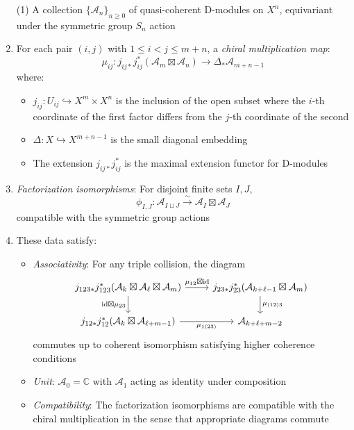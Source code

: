 \begin{enumerate}
\item[(1)] A collection $\{\mathcal{A}_n\}_{n \geq 0}$ of quasi-coherent D-modules on $X^n$, equivariant under 
the symmetric group $S_n$ action

\item For each pair $(i,j)$ with $1 \leq i < j \leq m+n$, a \emph{chiral multiplication map}:
\[
\mu_{ij}: j_{ij*}j_{ij}^* \left(\mathcal{A}_m \boxtimes \mathcal{A}_n\right) \to \Delta_{*}\mathcal{A}_{m+n-1}
\]
where:
\begin{itemize}
\item $j_{ij}: U_{ij} \hookrightarrow X^m \times X^n$ is the inclusion of the open subset where the 
$i$-th coordinate of the first factor differs from the $j$-th coordinate of the second
\item $\Delta: X \hookrightarrow X^{m+n-1}$ is the small diagonal embedding
\item The extension $j_{ij*}j_{ij}^*$ is the maximal extension functor for D-modules
\end{itemize}
 
\item \emph{Factorization isomorphisms}: For disjoint finite sets $I, J$,
\[
\phi_{I,J}: \mathcal{A}_{I \sqcup J} \xrightarrow{\sim} \mathcal{A}_I \boxtimes \mathcal{A}_J
\]
compatible with the symmetric group actions
 
\item These data satisfy:
\begin{itemize}
\item \emph{Associativity}: For any triple collision, the diagram
\[
\begin{tikzcd}
j_{123*}j_{123}^*(\mathcal{A}_k \boxtimes \mathcal{A}_\ell \boxtimes \mathcal{A}_m) 
\arrow[r, "\mu_{12} \boxtimes \text{id}"] \arrow[d, "\text{id} \boxtimes \mu_{23}"'] &
j_{23*}j_{23}^*(\mathcal{A}_{k+\ell-1} \boxtimes \mathcal{A}_m) \arrow[d, "\mu_{(12)3}"] \\
j_{12*}j_{12}^*(\mathcal{A}_k \boxtimes \mathcal{A}_{\ell+m-1}) \arrow[r, "\mu_{1(23)}"'] &
\mathcal{A}_{k+\ell+m-2}
\end{tikzcd}
\]
commutes up to coherent isomorphism satisfying higher coherence conditions
 
\item \emph{Unit}: $\mathcal{A}_0 = \mathbb{C}$ with $\mathcal{A}_1$ acting as identity under composition
 
\item \emph{Compatibility}: The factorization isomorphisms are compatible with the chiral multiplication
in the sense that appropriate diagrams commute
\end{itemize}
\end{enumerate}
 
